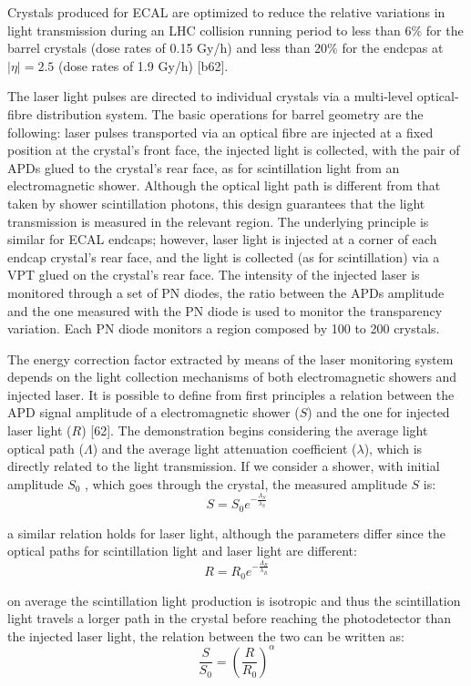 Crystals produced for ECAL are optimized to reduce the relative variations in light transmission
during an LHC collision running period to less than $6\%$ for the barrel
crystals (dose rates of 0.15 Gy/h) and less than $20\%$ for the endcpas at $|\eta| = 2.5$ (dose rates of
1.9 Gy/h) [b62].

The laser light pulses are directed to individual crystals via a multi-level optical-fibre distribution
system. The basic operations for barrel geometry are the following: laser pulses transported via
an optical fibre are injected at a fixed position at the crystal’s front face, the injected light is
collected, with the pair of APDs glued to the crystal’s rear face, as for scintillation light from an
electromagnetic shower. Although the optical light path is different from that taken by shower
scintillation photons, this design guarantees that the light transmission is measured in the relevant region.
The underlying principle is similar for ECAL endcaps; however, laser light is injected
at a corner of each endcap crystal’s rear face, and the light is collected (as for scintillation) via
a VPT glued on the crystal’s rear face. The intensity of the injected laser is monitored through a set of PN diodes,
the ratio between the APDs amplitude and the one measured with
the PN diode is used to monitor the transparency variation. Each PN diode monitors a region composed by 100 to 200 crystals.

The energy correction factor extracted by means of the laser monitoring system depends on
the light collection mechanisms of both electromagnetic showers and injected laser.
It is possible to define from first principles a relation between
the APD signal amplitude of a electromagnetic shower ($S$) and the one for injected laser light ($R$) [62].
The demonstration begins considering the average light optical path ($\Lambda$) and the average light attenuation
coefficient ($\lambda$), which is directly related to the light transmission. If we consider a shower, with
initial amplitude $S_0$ , which goes through the crystal, the measured amplitude $S$ is:
\[
  S = S_0 e^{-\frac{\Lambda_S}{\lambda_S}}
\]

a similar relation holds for laser light, although the parameters differ since the optical paths for scintillation
light and laser light are different:
\[
  R = R_0 e^{-\frac{\Lambda_R}{\lambda_R}}
\]

on average the scintillation light production is isotropic and thus
the scintillation light travels a lorger path in the crystal before reaching the photodetector than the
injected laser light, the relation between the two can be written as:
\begin{equation}
  \frac{S}{S_0} = \left(\frac{R}{R_0}\right)^{\alpha}
\end{equation}
\label{eq:light_relation}

